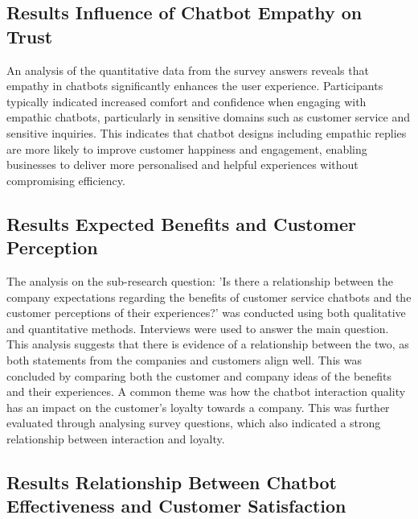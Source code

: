 \documentclass[a4paper]{article}
\begin{document}
\subsection{Results Influence of Chatbot Empathy on Trust}

An analysis of the quantitative data from the survey answers reveals that empathy in chatbots significantly enhances the user experience. Participants typically indicated increased comfort and confidence when engaging with empathic chatbots, particularly in sensitive domains such as customer service and sensitive inquiries. This indicates that chatbot designs including empathic replies are more likely to improve customer happiness and engagement, enabling businesses to deliver more personalised and helpful experiences without compromising efficiency.

\subsection{Results Expected Benefits and Customer Perception}

The analysis on the sub-research question: 'Is there a relationship between the company expectations regarding the benefits of customer service chatbots and the customer perceptions of their experiences?' was conducted using both qualitative and quantitative methods. Interviews were used to answer the main question. This analysis suggests that there is evidence of a relationship between the two, as both statements from the companies and customers align well. This was concluded by comparing both the customer and company ideas of the benefits and their experiences. A common theme was how the chatbot interaction quality has an impact on the customer's loyalty towards a company. This was further evaluated through analysing survey questions, which also indicated a strong relationship between interaction and loyalty.

\subsection{Results Relationship Between Chatbot Effectiveness and Customer Satisfaction}
\end{document}
